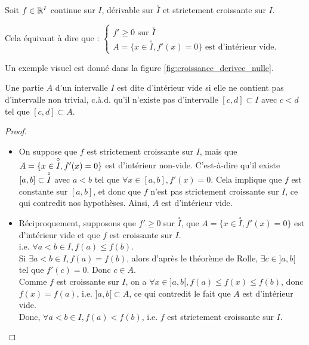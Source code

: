 \documentclass[12pt, a4paper]{report}
\begin{document}
\begin{theorem}
  Soit $f \in \mathbb{R}^I$ continue sur $I$, dérivable sur $\overset{\circ}{I}$ et strictement croissante sur $I$.

  Cela équivaut à dire que : $\begin{cases} f'\ge 0 \text{ sur } \overset{\circ}{I} \\ A = \{x\in\overset{\circ}{I}, f'(x) = 0\} \text{ est d'intérieur vide.} \end{cases}$

  Un exemple visuel est donné dans la figure \ref{fig:croissance_derivee_nulle}.
\end{theorem}

\begin{remark}
  Une partie $A$ d'un intervalle $I$ est dite d'intérieur vide si elle ne contient pas d'intervalle non trivial, c.à.d. qu'il n'existe pas d'intervalle $[c,d] \subset I$ avec $c < d$ tel que $[c,d] \subset A$.
\end{remark}

\begin{proof}
  \begin{itemize}
    \item On suppose que $f$ est strictement croissante sur $I$, mais que $A=\{x\in\overset{\circ}{I},f'(x)=0\}$ est d'intérieur non-vide. C'est-à-dire qu'il existe $[a,b]\subset \overset{\circ}{I}$ avec $a<b$ tel que $\forall x\in[a,b], f'(x) = 0$. Cela implique que $f$ est constante sur $[a,b]$, et donc que $f$ n'est pas strictement croissante sur $I$, ce qui contredit nos hypothèses. Ainsi, $A$ est d'intérieur vide.
    \item Réciproquement, supposons que $f'\ge 0$ sur $\overset{\circ}{I}$, que $A = \{x\in\overset{\circ}{I}, f'(x) = 0\}$ est d'intérieur vide et que $f$ est croissante sur $I$.\\i.e. $\forall a<b \in I, f(a) \le f(b)$.\\Si $\exists a<b\in I, f(a) = f(b)$, alors d'après le théorème de Rolle, $\exists c\in]a,b[$ tel que $f'(c) = 0$. Donc $c\in A$.\\Comme $f$ est croissante sur $I$, on a $\forall x\in]a,b[, f(a) \le f(x) \le f(b)$, donc $f(x) = f(a)$, i.e. $]a,b[ \subset A$, ce qui contredit le fait que $A$ est d'intérieur vide.\\Donc, $\forall a<b \in I, f(a) < f(b)$, i.e. $f$ est strictement croissante sur $I$.
  \end{itemize}
\end{proof}
\end{document}

